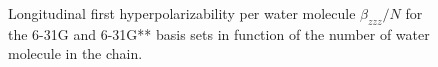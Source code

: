 \documentclass[prl,aps,twocolumn,showpacs,twocolumngrid,superbib]{revtex4}
\begin{document}
\begin{figure}[t]
  \caption{\protect
    Longitudinal first hyperpolarizability per water 
    molecule $\beta_{zzz}/N$ for 
    the 6-31G and 6-31G** basis sets in function
    of the number of water molecule in the chain.
  }\label{fig:Beta_1D}
\end{figure}
\end{document}
